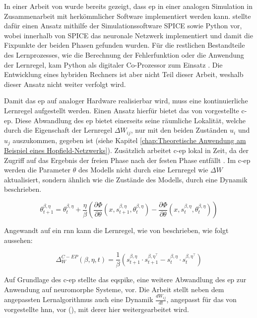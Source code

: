 In einer Arbeit von \citeauthor{Kendall2020} wurde bereits gezeigt, dass \ac{ep} in einer analogen Simulation in Zusammenarbeit mit herkömmlicher Software implementiert werden kann. \citeauthor{Kendall2020} stellte dafür einen Ansatz mithilfe der Simulationssoftware SPICE sowie Python vor, wobei innerhalb von SPICE das neuronale Netzwerk implementiert und damit die Fixpunkte der beiden Phasen gefunden wurden. Für die restlichen Bestandteile des Lernprozesses, wie die Berechnung der Fehlerfunktion oder die Anwendung der Lernregel, kam Python als digitaler Co-Prozessor zum Einsatz \cite[vgl. S. 27]{Kendall2020}. Die Entwicklung eines hybriden Rechners ist aber nicht Teil dieser Arbeit, weshalb dieser Ansatz nicht weiter verfolgt wird.

Damit das \ac{ep} auf analoger Hardware realisierbar wird, muss eine kontinuierliche Lernregel aufgestellt werden. Einen Ansatz hierfür bietet das \citeyear{Ernoult2020} von \citeauthor{Ernoult2020} vorgestellte \ac{c-ep}. Diese Abwandlung des \ac{ep} bietet einerseits seine räumliche Lokalität, welche durch die Eigenschaft der Lernregel \(\Delta W_{ij}\), nur mit den beiden Zuständen \(u_{i}\) und \(u_{j}\) auszukommen, gegeben ist (siehe Kapitel \ref{chap:Theoretische Anwendung am Beispiel eines Hopfield-Netzwerks}). Zusätzlich arbeitet \ac{c-ep} lokal in Zeit, da der Zugriff auf das Ergebnis der freien Phase nach der festen Phase entfällt \cite[vgl. S. 3 f.]{Ernoult2020}. Im \ac{c-ep} werden die Parameter \(\theta\) des Modells nicht durch eine Lernregel wie \(\Delta W\) aktualisiert, sondern ähnlich wie die Zustände des Modells, durch eine Dynamik beschrieben.

\[\theta^{\beta,\eta}_{t+1}={\theta^{\beta,\eta}_{t}}+\frac{\eta}{\beta}\left(\frac{\partial{\Phi}}{\partial{\theta}}(x,s^{\beta,\eta}_{t+1},\theta^{\beta,\eta}_{t})-\frac{\partial{\Phi}}{\partial{\theta}}(x,s^{\beta,\eta}_{t},\theta^{\beta,\eta}_{t})\right)\]

Angewandt auf ein \ac{rnn} kann die Lernregel, wie von \citeauthor{Ernoult2020} beschrieben, wie folgt aussehen:

\[\Delta^{C-EP}_W(\beta,\eta,t)=\frac{1}{\beta}(s^{\beta,\eta}_{t+1}\cdot s^{\beta,\eta^{\intercal}}_{t+1}-s^{\beta,\eta}_{t}\cdot s^{\beta,\eta^{\intercal}}_{t})\]

Auf Grundlage des \ac{c-ep} stellte \citeauthor{Martin2020} das \ac{eqspike}, eine weitere Abwandlung des \ac{ep} zur Anwendung auf neuromorphe Systeme, vor. Die Arbeit stellt neben dem angepassten Lernalgorithmus auch eine Dynamik \(\frac{dW_{ij}}{dt}\), angepasst für das von \citeauthor{Scellier2017} vorgestellte \ac{hnn}, vor (\cite[vgl. S. 3]{Martin2020}), mit derer hier weitergearbeitet wird.

